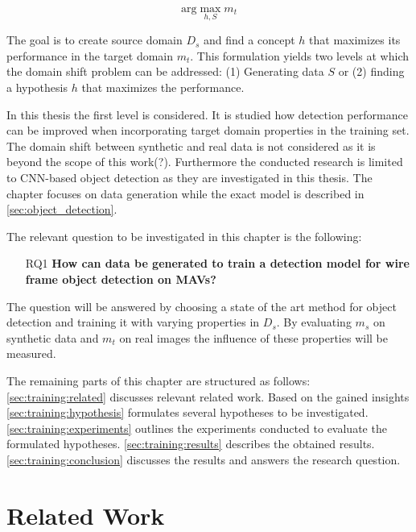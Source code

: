 $$
\text{arg}\max\limits_{h,S} m_t
$$

The goal is to create source domain $D_s$ and find a concept $h$ that maximizes its performance in the target domain $m_t$. This formulation yields two levels at which the domain shift problem can be addressed: (1) Generating data $S$ or (2) finding a hypothesis $h$ that maximizes the performance.

In this thesis the first level is considered. It is studied how detection performance can be improved when incorporating target domain properties in the training set. The domain shift between synthetic and real data is not considered as it is beyond the scope of this work(?). Furthermore the conducted research is limited to \ac{CNN}-based object detection as they are investigated in this thesis. The chapter focuses on data generation while the exact model is described in \autoref{sec:object_detection}.

The relevant question to be investigated in this chapter is the following:

\begin{center}
	\begin{enumerate}
		\item [RQ1] \textbf{How can data be generated to train a detection model for wire frame object detection on \acp{MAV}?}
	\end{enumerate}
\end{center}

The question will be answered by choosing a state of the art method for object detection and training it with varying properties in $D_s$. By evaluating $m_s$ on synthetic data and $m_t$ on real images the influence of these properties will be measured.

The remaining parts of this chapter are structured as follows: \autoref{sec:training:related} discusses relevant related work. Based on the gained insights \autoref{sec:training:hypothesis} formulates several hypotheses to be investigated. \autoref{sec:training:experiments} outlines the experiments conducted to evaluate the formulated hypotheses. \autoref{sec:training:results} describes the obtained results. \autoref{sec:training:conclusion} discusses the results and answers the research question.

\section{Related Work}
\label{sec:training:related}


